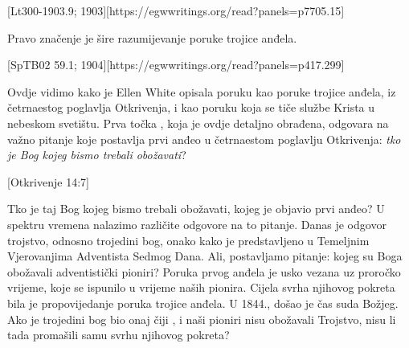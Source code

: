  \label{chap:remembering-the-beginning}

[Lt300-1903.9; 1903][https://egwwritings.org/read?panels=p7705.15]

Pravo značenje  je šire razumijevanje poruke trojice anđela.

[SpTB02 59.1; 1904][https://egwwritings.org/read?panels=p417.299]

Ovdje vidimo kako je Ellen White opisala poruku  kao poruke trojice anđela, iz četrnaestog poglavlja Otkrivenja, i kao poruku koja se tiče službe Krista u nebeskom svetištu. Prva točka , koja je ovdje detaljno obrađena, odgovara na važno pitanje koje postavlja prvi anđeo u četrnaestom poglavlju Otkrivenja: \textit{tko je Bog kojeg bismo trebali obožavati}?

[Otkrivenje 14:7]

Tko je taj Bog kojeg bismo trebali obožavati, kojeg je objavio prvi anđeo? U spektru vremena nalazimo različite odgovore na to pitanje. Danas je odgovor trojstvo, odnosno trojedini bog, onako kako je predstavljeno u Temeljnim Vjerovanjima Adventista Sedmog Dana. Ali, postavljamo pitanje: kojeg su Boga obožavali adventistički pioniri? Poruka prvog anđela je usko vezana uz proročko vrijeme, koje se ispunilo u vrijeme naših pionira. Cijela svrha njihovog pokreta bila je propovijedanje poruka trojice anđela. U 1844., došao je čas suda Božjeg. Ako je trojedini bog bio onaj čiji , i naši pioniri nisu obožavali Trojstvo, nisu li tada promašili samu svrhu njihovog pokreta?

